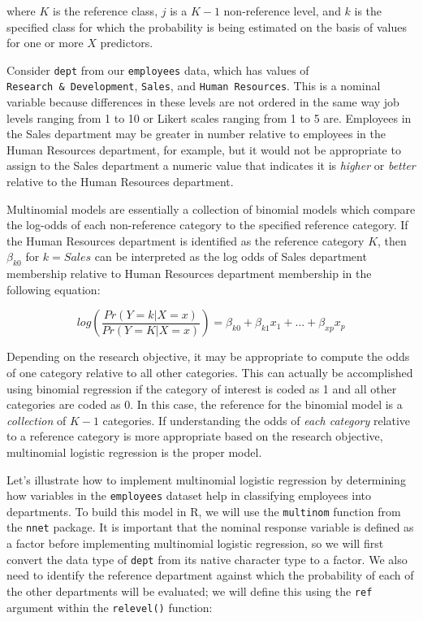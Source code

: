 \documentclass[
]{book}
\begin{document}
where \(K\) is the reference class, \(j\) is a \(K-1\) non-reference level, and \(k\) is the specified class for which the probability is being estimated on the basis of values for one or more \(X\) predictors.

Consider \texttt{dept} from our \texttt{employees} data, which has values of \texttt{Research\ \&\ Development}, \texttt{Sales}, and \texttt{Human\ Resources}. This is a nominal variable because differences in these levels are not ordered in the same way job levels ranging from 1 to 10 or Likert scales ranging from 1 to 5 are. Employees in the Sales department may be greater in number relative to employees in the Human Resources department, for example, but it would not be appropriate to assign to the Sales department a numeric value that indicates it is \emph{higher} or \emph{better} relative to the Human Resources department.

Multinomial models are essentially a collection of binomial models which compare the log-odds of each non-reference category to the specified reference category. If the Human Resources department is identified as the reference category \(K\), then \(\beta_{k0}\) for \(k = Sales\) can be interpreted as the log odds of Sales department membership relative to Human Resources department membership in the following equation:

\[ log(\frac{Pr(Y = k | X = x)} {Pr(Y = K | X = x)}) = \beta_{k0} + \beta_{k1}x_1 + ... + \beta_{xp}x_p \]

Depending on the research objective, it may be appropriate to compute the odds of one category relative to all other categories. This can actually be accomplished using binomial regression if the category of interest is coded as 1 and all other categories are coded as 0. In this case, the reference for the binomial model is a \emph{collection} of \(K-1\) categories. If understanding the odds of \emph{each category} relative to a reference category is more appropriate based on the research objective, multinomial logistic regression is the proper model.

Let's illustrate how to implement multinomial logistic regression by determining how variables in the \texttt{employees} dataset help in classifying employees into departments. To build this model in R, we will use the \texttt{multinom} function from the \texttt{nnet} package. It is important that the nominal response variable is defined as a factor before implementing multinomial logistic regression, so we will first convert the data type of \texttt{dept} from its native character type to a factor. We also need to identify the reference department against which the probability of each of the other departments will be evaluated; we will define this using the \texttt{ref} argument within the \texttt{relevel()} function:
\end{document}
